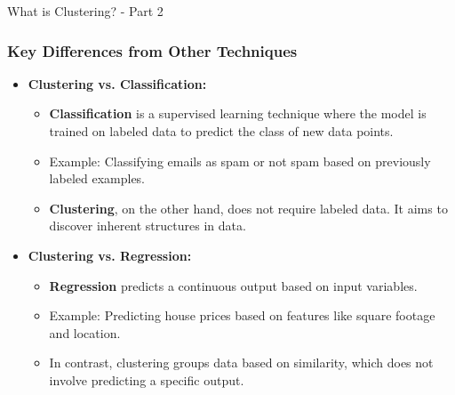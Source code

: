 \documentclass[aspectratio=169]{beamer}
\begin{document}
\begin{frame}[fragile]{What is Clustering? - Part 2}
    \frametitle{Key Differences from Other Techniques}
    \begin{itemize}
        \item \textbf{Clustering vs. Classification:}
        \begin{itemize}
            \item \textbf{Classification} is a supervised learning technique where the model is trained on labeled data to predict the class of new data points.
            \item Example: Classifying emails as spam or not spam based on previously labeled examples.
            \item \textbf{Clustering}, on the other hand, does not require labeled data. It aims to discover inherent structures in data.
        \end{itemize}

        \item \textbf{Clustering vs. Regression:}
        \begin{itemize}
            \item \textbf{Regression} predicts a continuous output based on input variables.
            \item Example: Predicting house prices based on features like square footage and location.
            \item In contrast, clustering groups data based on similarity, which does not involve predicting a specific output.
        \end{itemize}
    \end{itemize}
\end{frame}
\end{document}
